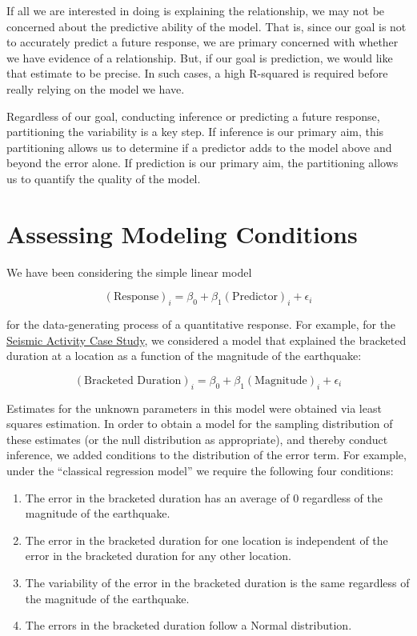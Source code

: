 \documentclass[
]{book}
\providecommand{\tightlist}{%
  \setlength{\itemsep}{0pt}\setlength{\parskip}{0pt}}
\theoremstyle{plain}
\theoremstyle{mydefn}
\theoremstyle{myexmpl}
\theoremstyle{remark}
\begin{document}
If all we are interested in doing is explaining the relationship, we may not be concerned about the predictive ability of the model. That is, since our goal is not to accurately predict a future response, we are primary concerned with whether we have evidence of a relationship. But, if our goal is prediction, we would like that estimate to be precise. In such cases, a high R-squared is required before really relying on the model we have.

Regardless of our goal, conducting inference or predicting a future response, partitioning the variability is a key step. If inference is our primary aim, this partitioning allows us to determine if a predictor adds to the model above and beyond the error alone. If prediction is our primary aim, the partitioning allows us to quantify the quality of the model.

\hypertarget{Regassessment}{%
\chapter{Assessing Modeling Conditions}\label{Regassessment}}

We have been considering the simple linear model

\[(\text{Response})_i = \beta_0 + \beta_1 (\text{Predictor})_{i} + \epsilon_i\]

for the data-generating process of a quantitative response. For example, for the \protect\hyperlink{CaseGreece}{Seismic Activity Case Study}, we considered a model that explained the bracketed duration at a location as a function of the magnitude of the earthquake:

\[(\text{Bracketed Duration})_i = \beta_0 + \beta_1(\text{Magnitude})_i + \epsilon_i\]

Estimates for the unknown parameters in this model were obtained via least squares estimation. In order to obtain a model for the sampling distribution of these estimates (or the null distribution as appropriate), and thereby conduct inference, we added conditions to the distribution of the error term. For example, under the ``classical regression model'' we require the following four conditions:

\begin{enumerate}
\def\labelenumi{\arabic{enumi}.}
\tightlist
\item
  The error in the bracketed duration has an average of 0 regardless of the magnitude of the earthquake.
\item
  The error in the bracketed duration for one location is independent of the error in the bracketed duration for any other location.
\item
  The variability of the error in the bracketed duration is the same regardless of the magnitude of the earthquake.
\item
  The errors in the bracketed duration follow a Normal distribution.
\end{enumerate}
\end{document}
